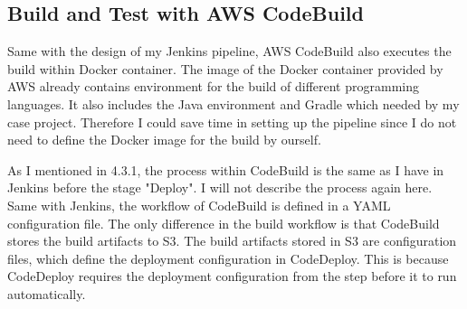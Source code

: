 \subsection{Build and Test with AWS CodeBuild}
Same with the design of my Jenkins pipeline, AWS CodeBuild also executes the build within Docker container. The image of the Docker container provided by AWS already contains environment for the build of different programming languages. It also includes the Java environment and Gradle which needed by my case project. Therefore I could save time in setting up the pipeline since I do not need to define the Docker image for the build by ourself.
\par
As I mentioned in 4.3.1, the process within CodeBuild is the same as I have in Jenkins before the stage "Deploy". I will not describe the process again here. Same with Jenkins, the workflow of CodeBuild is defined in a YAML configuration file. The only difference in the build workflow is that CodeBuild stores the build artifacts to S3. The build artifacts stored in S3 are configuration files, which define the deployment configuration in CodeDeploy. This is because CodeDeploy requires the deployment configuration from the step before it to run automatically.
